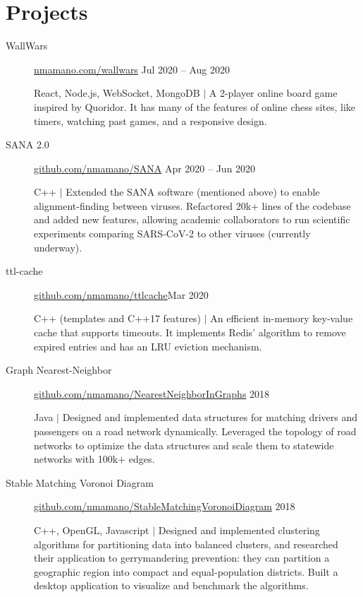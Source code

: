 \documentclass[letterpaper,10pt,oneside]{article}
\begin{document}
\section*{Projects}
\begin{description}
	\item[WallWars]\quad \href{http://nmamano.com/wallwars/index.html}{nmamano.com/wallwars} \hfill Jul 2020 -- Aug 2020
	
	React, Node.js, WebSocket, MongoDB $|$ A 2-player online board game inspired by Quoridor. It has many of the features of online chess sites, like timers, watching past games, and a responsive design.
	 
	\item[SANA 2.0]\quad  \href{https://github.com/nmamano/SANA}{github.com/nmamano/SANA} \hfill Apr 2020 -- Jun 2020
	
	C++ $|$ Extended the SANA software (mentioned above) to enable alignment-finding between viruses. Refactored 20k+ lines of the codebase and added new features, allowing academic collaborators to run scientific experiments comparing SARS-CoV-2 to other viruses (currently underway).

	\item[ttl-cache]\quad  \href{https://github.com/nmamano/ttlcache}{github.com/nmamano/ttlcache}\hfill  Mar 2020
	
	C++ (templates and C++17 features) $|$ An efficient in-memory key-value cache that supports timeouts. It implements Redis' algorithm to remove expired entries and has an LRU eviction mechanism.
	
	\item[Graph Nearest-Neighbor]\quad  \href{https://github.com/nmamano/NearestNeighborInGraphs}{github.com/nmamano/NearestNeighborInGraphs} \hfill 2018
	 
	 Java $|$ Designed and implemented data structures for matching drivers and passengers on a road network dynamically. Leveraged the topology of road networks to optimize the data structures and scale them to statewide networks with 100k+ edges.  
	\item[Stable Matching Voronoi Diagram]\quad  \href{https://github.com/nmamano/StableMatchingVoronoiDiagram}{github.com/nmamano/StableMatchingVoronoiDiagram} \hfill 2018
	
	C++, OpenGL, Javascript $|$ Designed and implemented clustering algorithms for partitioning data into balanced clusters, and researched their application to gerrymandering prevention: they can partition a geographic region into compact and equal-population districts. Built a desktop application to visualize and benchmark the algorithms.
	 \begin{comment}
	\item[Chespel]\quad  \href{https://github.com/nmamano/Chespel}{github.com/nmamano/Chespel}\hfill 2014
	

\end{comment}
\end{description}
\end{document}

